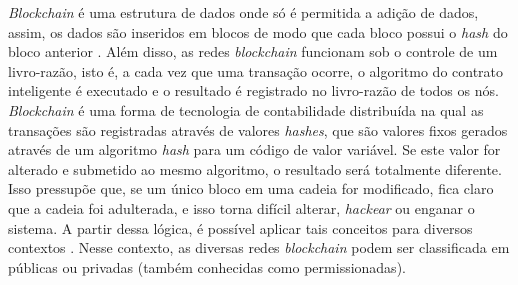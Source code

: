 \documentclass[portuguese]{textolivre}
\begin{document}
	\emph{Blockchain} é uma estrutura de dados onde só é permitida a adição de dados, assim, os dados são inseridos em blocos de modo que cada bloco possui o \emph{hash} do bloco anterior \cite{nakamoto2008bitcoin}. Além disso, as redes \emph{blockchain} funcionam sob o controle de um livro-razão, isto é, a cada vez que uma transação ocorre, o algoritmo do contrato inteligente é executado e o resultado é registrado no livro-razão de todos os nós. \emph{Blockchain} é uma forma de tecnologia de contabilidade distribuída na qual as transações são registradas através de valores \emph{hashes}, que são valores fixos gerados através de um algoritmo \emph{hash} para um código de valor variável. Se este valor for alterado e submetido ao mesmo algoritmo, o resultado será totalmente diferente. Isso pressupõe que, se um único bloco em uma cadeia for modificado, fica claro que a cadeia foi adulterada, e isso torna difícil alterar, \emph{hackear} ou enganar o sistema. A partir dessa lógica, é possível aplicar tais conceitos para diversos contextos  \cite{10061373}. Nesse contexto, as diversas redes \textit{blockchain} podem ser classificada em públicas ou privadas (também conhecidas como permissionadas).
	
	
	
\end{document}
